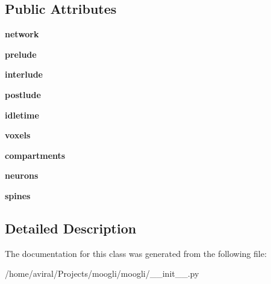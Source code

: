 \subsection*{Public Attributes}
\begin{DoxyCompactItemize}
\item 
\hypertarget{classmoogli_1_1NetworkViewer_afc9a9f8f0fdb11c19f81606907c0610f}{{\bfseries network}}\label{classmoogli_1_1NetworkViewer_afc9a9f8f0fdb11c19f81606907c0610f}

\item 
\hypertarget{classmoogli_1_1NetworkViewer_ab989dbe31b6e11fd9022d827932bde3a}{{\bfseries prelude}}\label{classmoogli_1_1NetworkViewer_ab989dbe31b6e11fd9022d827932bde3a}

\item 
\hypertarget{classmoogli_1_1NetworkViewer_a82183dd7b7f3bf1ee58ebcb57bdc788a}{{\bfseries interlude}}\label{classmoogli_1_1NetworkViewer_a82183dd7b7f3bf1ee58ebcb57bdc788a}

\item 
\hypertarget{classmoogli_1_1NetworkViewer_a9c135c52aad145039bf65801fe32b960}{{\bfseries postlude}}\label{classmoogli_1_1NetworkViewer_a9c135c52aad145039bf65801fe32b960}

\item 
\hypertarget{classmoogli_1_1NetworkViewer_a69e68d3e487c0424d86612ac48e47df4}{{\bfseries idletime}}\label{classmoogli_1_1NetworkViewer_a69e68d3e487c0424d86612ac48e47df4}

\item 
\hypertarget{classmoogli_1_1NetworkViewer_a51fa7bbaac48d38196b5ea872408ab65}{{\bfseries voxels}}\label{classmoogli_1_1NetworkViewer_a51fa7bbaac48d38196b5ea872408ab65}

\item 
\hypertarget{classmoogli_1_1NetworkViewer_a81ef0e196b1d7586a98900087d0e1f60}{{\bfseries compartments}}\label{classmoogli_1_1NetworkViewer_a81ef0e196b1d7586a98900087d0e1f60}

\item 
\hypertarget{classmoogli_1_1NetworkViewer_a7c85a55ae093203a9fb939a9850dfc90}{{\bfseries neurons}}\label{classmoogli_1_1NetworkViewer_a7c85a55ae093203a9fb939a9850dfc90}

\item 
\hypertarget{classmoogli_1_1NetworkViewer_a89908c3465a915558404ba2516b620d0}{{\bfseries spines}}\label{classmoogli_1_1NetworkViewer_a89908c3465a915558404ba2516b620d0}

\end{DoxyCompactItemize}


\subsection{Detailed Description}


The documentation for this class was generated from the following file\-:\begin{DoxyCompactItemize}
\item 
/home/aviral/\-Projects/moogli/moogli/\-\_\-\-\_\-init\-\_\-\-\_\-.\-py\end{DoxyCompactItemize}
